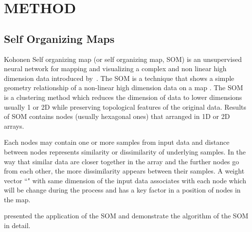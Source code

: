
\section{METHOD}
\label{sec: method}
 \subsection{Self Organizing Maps}
 \label{sec: som}
 
 Kohonen Self organizing map (or self organizing map, SOM) is an unsupervised neural network for mapping and visualizing a complex and non linear high dimension data introduced by~\citep{Kohonen82}. 
 The SOM is a technique that shows a simple geometry relationship of a non-linear high dimension data on a map \citep{Kohonen98}.
 The SOM is a clustering method which reduces the dimension of data to lower dimensions usually 1 or 2D while preserving topological features of the original data.
 Results of SOM contains nodes (usually hexagonal ones) that arranged in 1D or 2D arrays.
 
  
 Each nodes may contain one or more samples from input data and distance between nodes represents similarity or dissimilarity of underlying samples. 
 In the way that similar data are closer together in the array and the further nodes go from each other, the more dissimilarity appears between their samples.
 A weight vector ``" with same dimension of the input data associates with each node which will be change during the process and has a key factor in a position of nodes in the map. 
 
 \cite{Geach12} presented the application of the SOM and demonstrate the algorithm of the SOM in detail.
 
